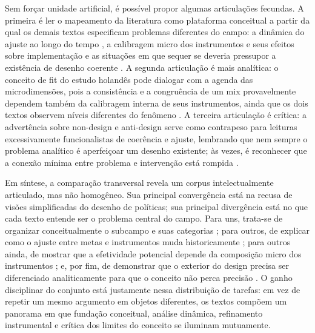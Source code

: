 \documentclass[12pt,a4paper]{article}
\begin{document}
Sem forçar unidade artificial, é possível propor algumas articulações fecundas. A primeira é ler o mapeamento da literatura como plataforma conceitual a partir da qual os demais textos especificam problemas diferentes do campo: a dinâmica do ajuste ao longo do tempo \parencite{lima2021_conectando_problemas,geet2019_policy_design}, a calibragem micro dos instrumentos e seus efeitos sobre implementação \parencite{lima2021_conectando_problemas,lui2026_micro_dimensions} e as situações em que sequer se deveria pressupor a existência de desenho coerente \parencite{lima2021_conectando_problemas,newman2020_policy_design}. A segunda articulação é mais analítica: o conceito de fit do estudo holandês pode dialogar com a agenda das microdimensões, pois a consistência e a congruência de um mix provavelmente dependem também da calibragem interna de seus instrumentos, ainda que os dois textos observem níveis diferentes do fenômeno \parencite{geet2019_policy_design,lui2026_micro_dimensions}. A terceira articulação é crítica: a advertência sobre non-design e anti-design serve como contrapeso para leituras excessivamente funcionalistas de coerência e ajuste, lembrando que nem sempre o problema analítico é aperfeiçoar um desenho existente; às vezes, é reconhecer que a conexão mínima entre problema e intervenção está rompida \parencite{newman2020_policy_design}.

Em síntese, a comparação transversal revela um corpus intelectualmente articulado, mas não homogêneo. Sua principal convergência está na recusa de visões simplificadas do desenho de políticas; sua principal divergência está no que cada texto entende ser o problema central do campo. Para uns, trata-se de organizar conceitualmente o subcampo e suas categorias \parencite{lima2021_conectando_problemas}; para outros, de explicar como o ajuste entre metas e instrumentos muda historicamente \parencite{geet2019_policy_design}; para outros ainda, de mostrar que a efetividade potencial depende da composição micro dos instrumentos \parencite{lui2026_micro_dimensions}; e, por fim, de demonstrar que o exterior do design precisa ser diferenciado analiticamente para que o conceito não perca precisão \parencite{newman2020_policy_design}. O ganho disciplinar do conjunto está justamente nessa distribuição de tarefas: em vez de repetir um mesmo argumento em objetos diferentes, os textos compõem um panorama em que fundação conceitual, análise dinâmica, refinamento instrumental e crítica dos limites do conceito se iluminam mutuamente.
\end{document}
